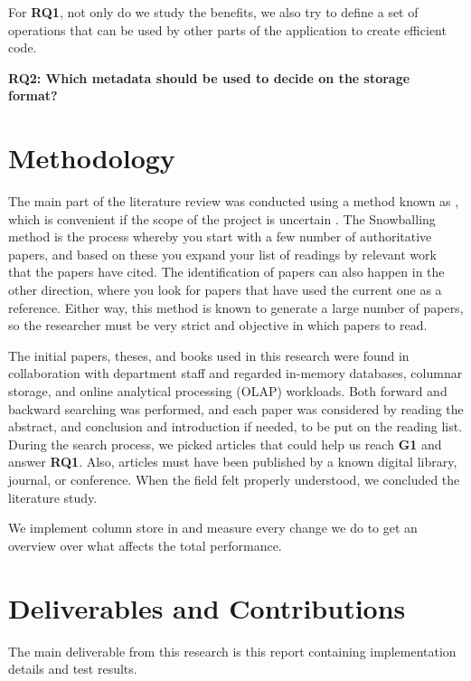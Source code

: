 For \textbf{RQ1}, not only do we study the benefits, we also try to define a set of operations that can be used by other parts of the application to create efficient code.

\textbf{RQ2: Which metadata should be used to decide on the storage format?} 

\section{Methodology}
\label{sec:Methodology}
The main part of the literature review was conducted using a method known as , which is convenient if the scope of the project is uncertain \cite{Ang2014-nm}. The Snowballing method is the process whereby you start with a few number of authoritative papers, and based on these you expand your list of readings by relevant work that the papers have cited. The identification of papers can also happen in the other direction, where you look for papers that have used the current one as a reference. Either way, this method is known to generate a large number of papers, so the researcher must be very strict and objective in which papers to read.

The initial papers, theses, and books used in this research were found in collaboration with department staff and regarded in-memory databases, columnar storage, and online analytical processing (OLAP) workloads. Both forward and backward searching was performed, and each paper was considered by reading the abstract, and conclusion and introduction if needed, to be put on the reading list. During the search process, we picked articles that could help us reach \textbf{G1} and answer \textbf{RQ1}. Also, articles must have been published by a known digital library, journal, or conference. When the field felt properly understood, we concluded the  literature study.

We implement column store in \gap and measure every change we do to get an overview over what affects the total performance.


\section{Deliverables and Contributions}
\label{sec:Deliverables and Contributions}
The main deliverable from this research is this report containing implementation details and test results.

